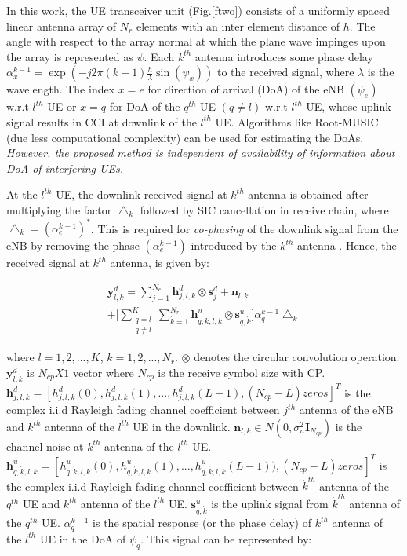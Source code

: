 \documentclass[conference]{IEEEtran}
\begin{document}
In this work, the UE transceiver unit (Fig.\ref{ftwo}) consists of a uniformly spaced linear antenna array of $N_r$ elements with an inter element distance of $h$. The angle with respect to the array normal at which the plane wave impinges upon the array is represented as $\psi$. Each $k^{th}$ antenna introduces some phase delay $\alpha^{k-1}_x = \exp(-j2 \pi (k-1) \frac{h}{\lambda} \sin(\psi_x))$ to the received signal, where $\lambda$ is the wavelength. The index $x=e$ for direction of arrival (DoA) of the eNB $(\psi_e)$ w.r.t $l^{th}$ UE or $x=q$ for DoA of the $q^{th}$ UE $(q \neq l)$ w.r.t $l^{th}$ UE, whose uplink signal results in CCI at downlink of the $l^{th}$ UE. Algorithms like Root-MUSIC (due less computational complexity) can be used for estimating the DoAs. \textit{However, the proposed method is independent of availability of information about DoA of interfering UEs.}\par

     At the $l^{th}$ UE, the downlink received signal at $k^{th}$ antenna is obtained after multiplying the factor $\bigtriangleup_k$ followed by SIC cancellation in receive chain, where $\bigtriangleup_k = (\alpha^{k-1}_e)^*$. This is required for \textit{co-phasing} of the downlink signal from the eNB by removing the phase $(\alpha^{k-1}_e)$ introduced by the $k^{th}$ antenna \cite{mrc}. Hence, the received signal at $k^{th}$ antenna, is given by:   \vspace{-1.00em}
     
     \begin{multline}
       \label{five}
 \mathbf{y}^d_{l,k}= \sum_{j=1}^{N_e} \mathbf{h}^d_{j,l,k} \otimes \mathbf{s}^d_j + \mathbf{n}_{l,k}  \\
+ \Big [ \sum_{\substack{ q=l \\ q \neq l}}^{K} \sum_{\acute{k}=1}^{N_r} \mathbf{h}^u_{q,\acute{k},l,k} \otimes \mathbf{s}^u_{q,\acute{k}}] \alpha^{k-1}_{q}  \bigtriangleup_k 
       \end{multline} 
       
       
where $ l=1,2,...,K$, $k=1,2,...,N_r$. $\otimes$  denotes the circular convolution operation. $\mathbf{y}^d_{l,k}$ is $N_{cp}X1$ vector where $N_{cp}$ is the receive symbol size with CP. $\mathbf{h}^{d}_{j,l,k}=[h^d_{j,l,k}(0),h^d_{j,l,k}(1),...,h^d_{j,l,k}(L-1),(N_{cp}-L)zeros]^T$ is the complex i.i.d Rayleigh fading channel coefficient between  $j^{th}$ antenna of the eNB and $k^{th}$ antenna of the $l^{th}$ UE in the downlink.  $\mathbf{n}_{l,k} \in N(0,\sigma_n^2 \mathbf{I}_{N_{cp}})$ is the channel noise at $k^{th}$ antenna of the $l^{th}$ UE. $\mathbf{h}^u_{q,\acute{k},l,k}=[h^u_{q,\acute{k},l,k}(0),h^u_{q,\acute{k},l,k}(1),...,h^u_{q,\acute{k},l,k}(L-1)),(N_{cp}-L)zeros]^T$ is the complex i.i.d Rayleigh fading channel coefficient between $\acute{k}^{th}$ antenna of the $q^{th}$ UE and $k^{th}$ antenna of the $l^{th}$ UE. $\mathbf{s}^u_{q,\acute{k}}$ is the uplink signal from $\acute{k}^{th}$ antenna of the $q^{th}$ UE. $\alpha^{k-1}_{q}$ is the spatial response (or the phase delay) of $k^{th}$ antenna of the $l^{th}$ UE in the DoA of $\psi_{q}$. This signal can be represented by:
\end{document}
